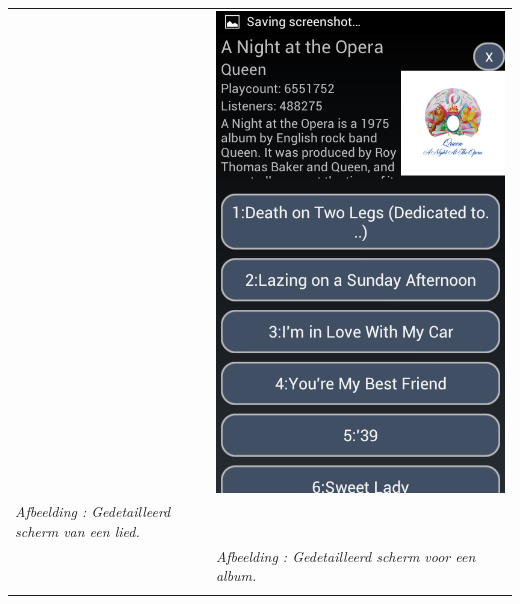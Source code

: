 \documentclass[11pt,a4paper]{article}
\newcounter{figc}
\newcommand{\increaseFigID} {%
   \stepcounter{figc}%
   \thefigc}
\newcommand{\figID}[1]{\small \textit{Afbeelding \increaseFigID : #1} \\ \normalsize}
\begin{document}
{\begin{tabular} {p{7cm} >{\centering\arraybackslash}p{7cm}@{\hskip 0.5in}}
		& \includegraphics[scale=0.28]{Pictures/Screenshot_2013-05-24-21-20-57.png} \\
		
		\centering \figID{Gedetailleerd scherm van een lied.} 
		&  \figID{Gedetailleerd scherm voor een album.} 
		
		\vspace{1pt} & \vspace{1pt} \\
		

\end{tabular}}
\end{document}
